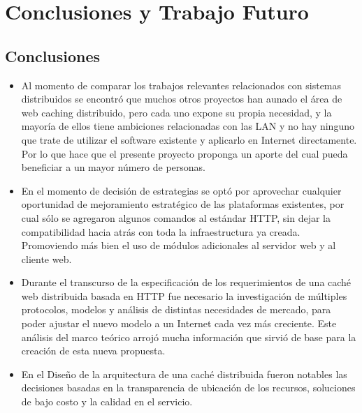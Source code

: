 
\chapter{Conclusiones y Trabajo Futuro} %

\label{ch:conclusiones} %


\section{Conclusiones}

\begin{itemize}
\item  Al momento de comparar los trabajos relevantes relacionados con sistemas distribuidos se encontró que muchos otros proyectos han aunado el área de web caching distribuido, pero cada uno expone su propia necesidad, y la mayoría de ellos tiene ambiciones relacionadas con las LAN y no hay ninguno que trate de utilizar el software existente y aplicarlo en Internet directamente. Por lo que hace que el presente proyecto proponga un aporte del cual pueda beneficiar a un mayor número de personas. 

\item En el momento de decisión de estrategias se optó por aprovechar cualquier oportunidad de mejoramiento estratégico de las plataformas existentes, por cual sólo se agregaron algunos comandos al estándar HTTP, sin dejar la compatibilidad hacia atrás con toda la infraestructura ya creada. Promoviendo más bien el uso de módulos adicionales al servidor web y al cliente web.

\item Durante el transcurso de la especificación de los requerimientos de una caché web distribuida basada en HTTP fue necesario la investigación de múltiples protocolos, modelos y análisis de distintas necesidades de mercado, para poder ajustar el nuevo modelo a un Internet cada vez más creciente. Este análisis del marco teórico arrojó mucha información que sirvió de base para la creación de esta nueva propuesta.

\item En el Diseño de la arquitectura de una caché distribuida fueron notables las decisiones basadas en la transparencia de ubicación de los recursos, soluciones de bajo costo y la calidad en el servicio. 


\end{itemize}
